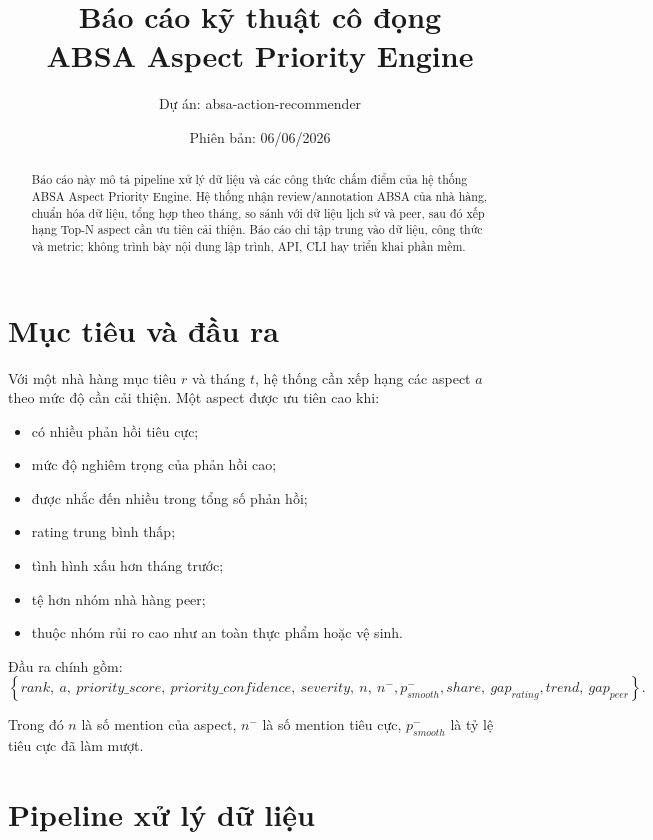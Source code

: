 \documentclass[12pt,a4paper]{article}
\title{\textbf{Báo cáo kỹ thuật cô đọng\\ABSA Aspect Priority Engine}}
\author{Dự án: absa-action-recommender}
\date{Phiên bản: 06/06/2026}
\begin{document}
\maketitle

\begin{abstract}
Báo cáo này mô tả pipeline xử lý dữ liệu và các công thức chấm điểm của hệ thống ABSA Aspect Priority Engine. Hệ thống nhận review/annotation ABSA của nhà hàng, chuẩn hóa dữ liệu, tổng hợp theo tháng, so sánh với dữ liệu lịch sử và peer, sau đó xếp hạng Top-N aspect cần ưu tiên cải thiện. Báo cáo chỉ tập trung vào dữ liệu, công thức và metric; không trình bày nội dung lập trình, API, CLI hay triển khai phần mềm.
\end{abstract}

\section{Mục tiêu và đầu ra}

Với một nhà hàng mục tiêu $r$ và tháng $t$, hệ thống cần xếp hạng các aspect $a$ theo mức độ cần cải thiện. Một aspect được ưu tiên cao khi:
\begin{itemize}
  \item có nhiều phản hồi tiêu cực;
  \item mức độ nghiêm trọng của phản hồi cao;
  \item được nhắc đến nhiều trong tổng số phản hồi;
  \item rating trung bình thấp;
  \item tình hình xấu hơn tháng trước;
  \item tệ hơn nhóm nhà hàng peer;
  \item thuộc nhóm rủi ro cao như an toàn thực phẩm hoặc vệ sinh.
\end{itemize}

Đầu ra chính gồm:
\begin{equation}
\left\{
rank,\ a,\ priority\_score,\ priority\_confidence,\ severity,\ n,\ n^{-}, p^{-}_{smooth},
share,\ gap_{rating}, trend,\ gap_{peer}
\right\}.
\end{equation}

Trong đó $n$ là số mention của aspect, $n^{-}$ là số mention tiêu cực, $p^{-}_{smooth}$ là tỷ lệ tiêu cực đã làm mượt.

\section{Pipeline xử lý dữ liệu}
\end{document}
